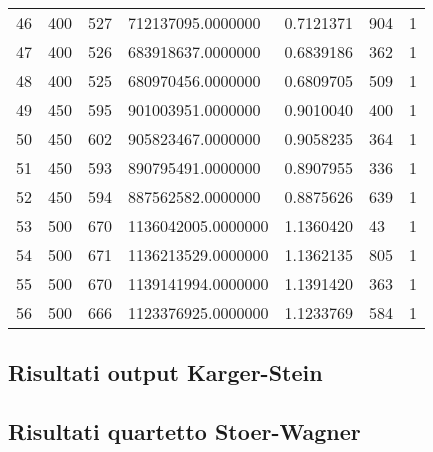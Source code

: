 \begin{longtable}[c]{lllllll}
  46 & 400 & 527 & 712137095.0000000 & 0.7121371 & 904 & 1 \\
  47 & 400 & 526 & 683918637.0000000 & 0.6839186 & 362 & 1 \\
  48 & 400 & 525 & 680970456.0000000 & 0.6809705 & 509 & 1 \\
  49 & 450 & 595 & 901003951.0000000 & 0.9010040 & 400 & 1 \\
  50 & 450 & 602 & 905823467.0000000 & 0.9058235 & 364 & 1 \\
  51 & 450 & 593 & 890795491.0000000 & 0.8907955 & 336 & 1 \\
  52 & 450 & 594 & 887562582.0000000 & 0.8875626 & 639 & 1 \\
  53 & 500 & 670 & 1136042005.0000000 & 1.1360420 & 43 & 1 \\
  54 & 500 & 671 & 1136213529.0000000 & 1.1362135 & 805 & 1 \\
  55 & 500 & 670 & 1139141994.0000000 & 1.1391420 & 363 & 1 \\
  56 & 500 & 666 & 1123376925.0000000 & 1.1233769 & 584 & 1
  \label{tab:table-stoerwagner-results}\\
  \end{longtable}

\subsection{Risultati output Karger-Stein}


\subsection{Risultati quartetto Stoer-Wagner}

